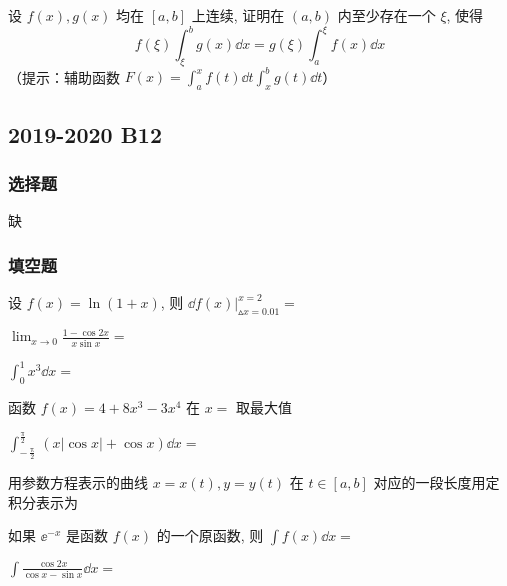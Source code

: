 \begin{ti}
	设 $f(x),g(x)$ 均在 $[a,b]$ 上连续, 证明在 $(a,b)$ 内至少存在一个 $\xi$, 使得
	\[
		f(\xi)\int_{\xi}^{b}g(x)\dd{x}=g(\xi)\int_{a}^{\xi}f(x)\dd{x}
	\]
	（提示：辅助函数 $F(x) = \int_{a}^{x}f(t)\dd{t}\int_{x}^{b}g(t)\dd{t}$）
\end{ti}

\subsection{2019-2020 B12}
\subsubsection{选择题}
缺

\subsubsection{填空题}
\begin{ti}
	设 $f(x) = \ln(1 + x)$, 则 $\dd{f(x)} \bigr|_{\vartriangle x = 0.01}^{x = 2} = $ \hua
\end{ti}

\begin{ti}
	$\lim_{x \to 0} \frac{1 - \cos 2x}{x \sin x} = $ \hua
\end{ti}

\begin{ti}
	$\int_{0}^{1} x^{3} \dd{x} = $ \hua
\end{ti}

\begin{ti}
	函数 $f(x) = 4 + 8x^{3} - 3x^{4}$ 在 $x = $ \hua{} 取最大值
\end{ti}

\begin{ti}
	$\int_{-\frac{\uppi}{2}}^{\frac{\uppi}{2}} (x|\cos x| + \cos x) \dd{x} = $ \hua
\end{ti}

\begin{ti}
	用参数方程表示的曲线 $x = x(t), y = y(t)$ 在 $t \in [a,b]$ 对应的一段长度用定积分表示为 \hua
\end{ti}

\begin{ti}
	如果 $\ee^{-x}$ 是函数 $f(x)$ 的一个原函数, 则 $\int f(x) \dd{x} = $ \hua
\end{ti}

\begin{ti}
	$\int \frac{\cos 2x}{\cos x - \sin x} \dd{x} = $ \hua
\end{ti}

